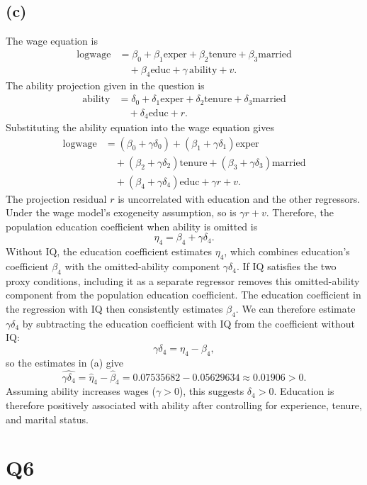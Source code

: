 \documentclass[11pt]{article}
\begin{document}
\subsection{(c)}
The wage equation is
\[
\begin{aligned}
\text{logwage}
&=\beta_0+\beta_1\text{exper}+\beta_2\text{tenure}
  +\beta_3\text{married}\\
&\quad+\beta_4\text{educ}+\gamma\,\text{ability}+v.
\end{aligned}
\]
The ability projection given in the question is
\[
\begin{aligned}
\text{ability}
&=\delta_0+\delta_1\text{exper}+\delta_2\text{tenure}
  +\delta_3\text{married}\\
&\quad+\delta_4\text{educ}+r.
\end{aligned}
\]
Substituting the ability equation into the wage equation gives
\[
\begin{aligned}
\text{logwage}
&=(\beta_0+\gamma\delta_0)
  +(\beta_1+\gamma\delta_1)\text{exper}\\
&\quad+(\beta_2+\gamma\delta_2)\text{tenure}
  +(\beta_3+\gamma\delta_3)\text{married}\\
&\quad+(\beta_4+\gamma\delta_4)\text{educ}+\gamma r+v.
\end{aligned}
\]
The projection residual $r$ is uncorrelated with education and the other
regressors. Under the wage model's exogeneity assumption, so is
$\gamma r+v$. Therefore, the population education coefficient when
ability is omitted is
\[
\eta_4=\beta_4+\gamma\delta_4.
\]
Without IQ, the education coefficient estimates $\eta_4$, which
combines education's coefficient $\beta_4$ with the omitted-ability
component $\gamma\delta_4$. If IQ satisfies the two proxy conditions,
including it as a separate regressor removes this omitted-ability
component from the population education coefficient. The education
coefficient in the regression with IQ then consistently estimates
$\beta_4$. We can therefore estimate $\gamma\delta_4$ by subtracting
the education coefficient with IQ from the coefficient without IQ:
\[
\gamma\delta_4=\eta_4-\beta_4,
\]
so the estimates in (a) give
\[
\widehat{\gamma\delta_4}
=\hat\eta_4-\hat\beta_4
=0.07535682-0.05629634\approx0.01906>0.
\]
Assuming ability increases wages ($\gamma>0$), this suggests
$\delta_4>0$. Education is therefore positively associated with ability
after controlling for experience, tenure, and marital status.

\clearpage
\section{Q6}
\label{sec:q6}
\end{document}
